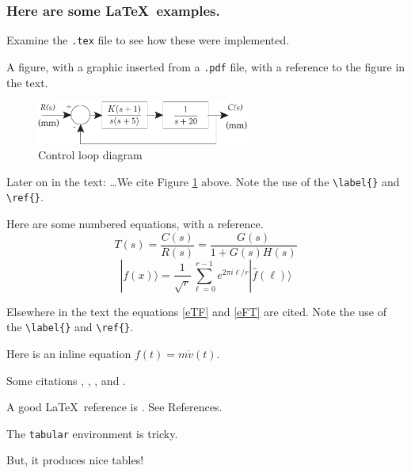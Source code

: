 \documentclass[twocolumn]{article}
\newcommand{\ket}[1]{|#1\rangle}
\begin{document}
\newpage
\subsubsection*{Here are some \LaTeX\ examples.} 

Examine the \verb|.tex| file to see how these were implemented.

\vspace{.167in}
A figure, with a graphic inserted from a \verb|.pdf| file, with a reference to the figure in the text.
\begin{figure}[htbp]
\begin{center}
\includegraphics[width=2.75in]{ControlLoop2.pdf}
\caption{Control loop diagram}
\label{ControlLoop}
\end{center}
\end{figure}

Later on in the text: \dots We cite Figure \ref{ControlLoop} above.  Note the use of the \verb|\label{}| and \verb|\ref{}|.

Here are some numbered equations, with a reference.
\begin{equation}
T(s)=\frac{C(s)}{R(s)}=\frac{G(s)}{1+G(s)H(s)}
\label{eTF}
\end{equation}
\begin{equation}
\ket{f(x)} = \frac{1}{\sqrt{r}}\sum_{\ell=0}^{r-1}e^{2\pi i \ell/r}\ket{\hat{f}(\ell)}
\label{eFT}
\end{equation}

Elsewhere in  the text the equations \ref{eTF} and \ref{eFT} are cited. Note the use of the \verb|\label{}| and \verb|\ref{}|.

\vspace{.167in}
Here is an inline equation $f(t)=m\dot{v}(t)$. 
 
\vspace{.167in}
Some citations \cite{Bendat1971}, \cite{PhysRev.104.563}, \cite{Oppenheim1975}, and \cite{Papoulis1965}. 
 
\vspace{.167in}
A good \LaTeX\ reference is \cite{Lamport1994}.  See References.

\vspace{.167in}
The \verb|tabular| environment is tricky. 

But, it produces nice tables!
\end{document}
